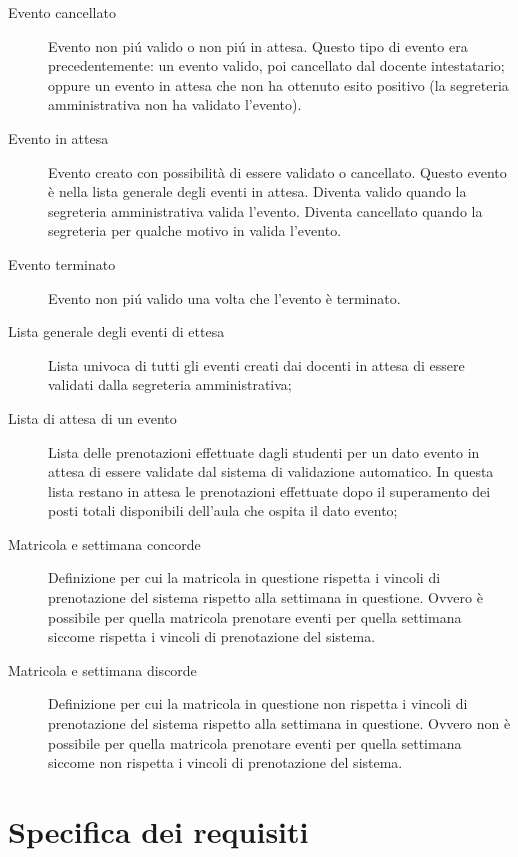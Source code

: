 \documentclass[11pt]{article}
\begin{document}
\begin{description}
\item [Evento cancellato] Evento non piú valido o non piú in attesa. Questo tipo di evento era precedentemente: un evento valido, poi cancellato dal docente intestatario; oppure un evento in attesa che non ha ottenuto esito positivo (la segreteria amministrativa non ha validato l'evento).
\item [Evento in attesa] Evento creato con possibilità di essere validato o cancellato. Questo evento è nella lista generale degli eventi in attesa. Diventa valido quando la segreteria amministrativa valida l'evento. Diventa cancellato quando la segreteria per qualche motivo in valida l'evento.
\item [Evento terminato] Evento non piú valido una volta che l'evento è terminato.
\item [Lista generale degli eventi di ettesa] Lista univoca di tutti gli eventi creati dai docenti in attesa di essere validati dalla segreteria amministrativa;
\item [Lista di attesa di un evento] Lista delle prenotazioni effettuate dagli studenti per un dato evento in attesa di essere validate dal sistema di validazione automatico. In questa lista restano in attesa le prenotazioni effettuate dopo il superamento dei posti totali disponibili dell'aula che ospita il dato evento;
\item [Matricola e settimana concorde] Definizione per cui la matricola in questione rispetta i vincoli di prenotazione del sistema rispetto alla settimana in questione. Ovvero è possibile per quella matricola prenotare eventi per quella settimana siccome rispetta i vincoli di prenotazione del sistema.
\item [Matricola e settimana discorde] Definizione per cui la matricola in questione non rispetta i vincoli di prenotazione del sistema rispetto alla settimana in questione. Ovvero non è possibile per quella matricola prenotare eventi per quella settimana siccome non rispetta i vincoli di prenotazione del sistema.
\end{description}
\newpage

\section{Specifica dei requisiti}
\end{document}

